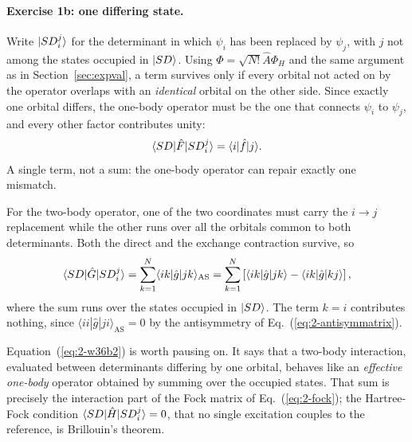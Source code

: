 \paragraph{Exercise 1b: one differing state.}
Write $\vert SD_i^j \rangle$ for the determinant in which $\psi_i$ has been replaced
by $\psi_j$, with $j$ not among the states occupied in $\vert SD \rangle$.  Using
$\Phi=\sqrt{N!}\hat{A}\Phi_H$ and the same argument as in
Section~\ref{sec:expval}, a term survives only if every orbital not acted on
by the operator overlaps with an \emph{identical} orbital on the other side.
Since exactly one orbital differs, the one-body operator must be the one that
connects $\psi_i$ to $\psi_j$, and every other factor contributes unity:
\begin{equation}
  \langle SD | \hat{F} | SD_i^j \rangle = \langle i|\hat{f}|j\rangle .
  \label{eq:2-w36b1}
\end{equation}
A single term, not a sum: the one-body operator can repair exactly one
mismatch.

For the two-body operator, one of the two coordinates must carry the
$i\rightarrow j$ replacement while the other runs over all the orbitals common
to both determinants.  Both the direct and the exchange contraction survive,
so
\begin{equation}
  \langle SD | \hat{G} | SD_i^j \rangle
   = \sum_{k=1}^{N}\langle ik|\hat{g}|jk\rangle_{\mathrm{AS}}
   = \sum_{k=1}^{N}\left[\langle ik|\hat{g}|jk\rangle
     -\langle ik|\hat{g}|kj\rangle\right],
  \label{eq:2-w36b2}
\end{equation}
where the sum runs over the states occupied in $\vert SD \rangle$.  The term $k=i$
contributes nothing, since $\langle ii|\hat{g}|ji\rangle_{\mathrm{AS}}=0$ by
the antisymmetry of Eq.~(\ref{eq:2-antisymmatrix}).

Equation~(\ref{eq:2-w36b2}) is worth pausing on.  It says that a two-body
interaction, evaluated between determinants differing by one orbital, behaves
like an \emph{effective one-body} operator obtained by summing over the
occupied states.  That sum is precisely the interaction part of the Fock
matrix of Eq.~(\ref{eq:2-fock}); the Hartree-Fock condition
$\langle SD | \hat{H} | SD_i^j \rangle=0$, that no single excitation couples to the
reference, is Brillouin's theorem.

